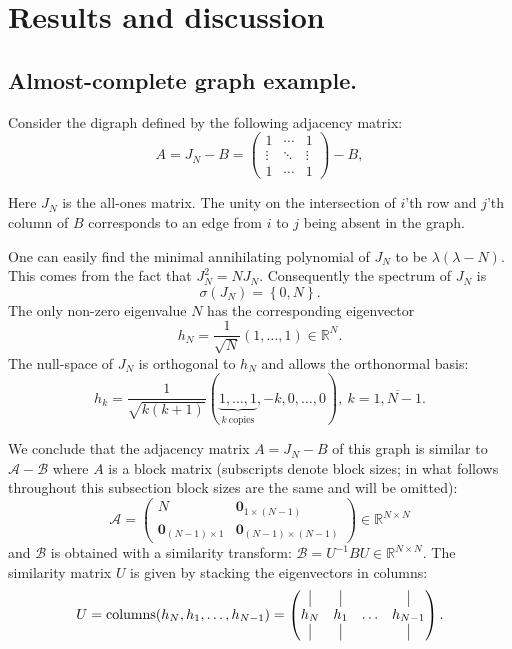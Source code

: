 \documentclass[a4paper]{jpconf}
\begin{document}
\section{Results and discussion}

\subsection*{Almost-complete graph example.}

Consider the digraph defined by the following adjacency matrix:
\[
    A = J_N - B = \begin{pmatrix}1 & \cdots & 1 \\ \vdots & \ddots & \vdots \\ 1 & \cdots & 1\end{pmatrix} - B,
\]

Here \( J_N \) is the all-ones matrix.
The unity on the intersection
of \( i \)'th row and \( j \)'th column of \( B \)
corresponds to an edge from \( i \) to \( j \)
being absent in the graph.

One can easily find the minimal annihilating polynomial of \( J_N \)
    to be \( \lambda(\lambda - N) \).
This comes from the fact that \( J_N^2 = N J_N \).
Consequently the spectrum of \( J_N \) is
\[
    \sigma(J_N) = \left\{0, N\right\}.
\]
The only non-zero eigenvalue \( N \) has the corresponding eigenvector
\[
    h_N = \frac{1}{\sqrt{N}} \left(1, \ldots, 1\right)\in\mathbb{R}^N.
\]
The null-space of \( J_N \) is orthogonal to \( h_N \)
    and allows the orthonormal basis:
\[
    h_k = \frac{1}{\sqrt{k(k+1)}} \left(\underbrace{1, \ldots, 1}_{k\ \text{copies}}, -k, 0, \ldots, 0\right),\ k=\overline{1, N-1}.
\]

We conclude that the adjacency matrix \( A = J_N - B \) of this graph
    is similar to \( \mathcal{A} - \mathcal{B} \)
    where \( A \) is a block matrix (subscripts denote block sizes; in what follows throughout this subsection block sizes are the same and will be omitted):
    \[
        \mathcal{A} = \left(\begin{array}{c|c}
        N & \mathbf{0}_{1{\times}(N{-}1)} \\ \hline
            \mathbf{0}_{(N{-}1){\times}1} & \mathbf{0}_{(N{-}1){\times}(N{-}1)}
        \end{array}\right) \in \mathbb{R}^{N{\times}N}
    \]
    and \( \mathcal{B} \) is obtained with a similarity transform:
    \(
        \mathcal{B} = U^{-1} B U \in \mathbb{R}^{N{\times}N}.
    \)
The similarity matrix \( U \) is given by stacking the eigenvectors in columns:
    \[
        U = \operatorname{columns}(h_N, h_1, \ldots, h_{N-1}) =
        \begin{pmatrix}
            \vline & \vline &        & \vline \\
            h_N    & h_1    & \ldots & h_{N-1} \\
            \vline & \vline &        & \vline

        \end{pmatrix}.
    \]
\end{document}
